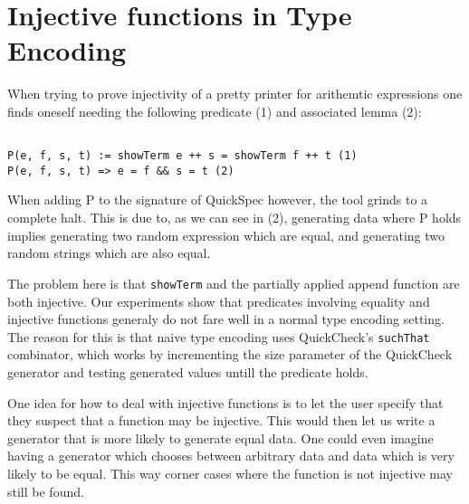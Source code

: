 \section{Injective functions in Type Encoding}
When trying to prove injectivity of a pretty printer for arithemtic expressions one
finds oneself needing the following predicate (1) and associated lemma (2):
\begin{verbatim}

P(e, f, s, t) := showTerm e ++ s = showTerm f ++ t (1)
P(e, f, s, t) => e = f && s = t (2)

\end{verbatim}
When adding P to the signature of QuickSpec however, the tool grinds to a complete halt. This is
due to, as we can see in (2), generating data where P holds implies generating two
random expression which are equal, and generating two random strings which are also equal.

The problem here is that \texttt{showTerm} and the partially applied append function are both injective.
Our experiments show that predicates involving equality and injective functions generaly do not
fare well in a normal type encoding setting. The reason for this is that naive type encoding uses
QuickCheck's \texttt{suchThat} combinator, which works by incrementing the size parameter of the QuickCheck
generator and testing generated values untill the predicate holds.

One idea for how to deal with injective functions is to let the user specify that they suspect that 
a function may be injective. This would then let us write a generator that is more likely to generate
equal data. One could even imagine having a generator which chooses between arbitrary data
and data which is very likely to be equal. This way corner cases where the function is not injective may
still be found.
